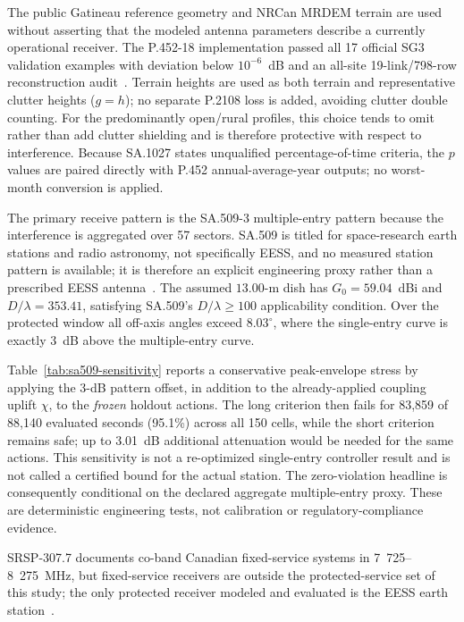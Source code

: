 \documentclass[journal]{IEEEtran}
\begin{document}
The public Gatineau reference geometry and NRCan MRDEM terrain are used without asserting that the modeled antenna parameters describe a currently operational receiver. The P.452-18 implementation passed all 17 official SG3 validation examples with deviation below $10^{-6}$~dB and an all-site 19-link/798-row reconstruction audit~\cite{iturp452,iturp452validation}. Terrain heights are used as both terrain and representative clutter heights ($g=h$); no separate P.2108 loss is added, avoiding clutter double counting. For the predominantly open/rural profiles, this choice tends to omit rather than add clutter shielding and is therefore protective with respect to interference. Because SA.1027 states unqualified percentage-of-time criteria, the $p$ values are paired directly with P.452 annual-average-year outputs; no worst-month conversion is applied.

The primary receive pattern is the SA.509-3 multiple-entry pattern because the interference is aggregated over 57 sectors. SA.509 is titled for space-research earth stations and radio astronomy, not specifically EESS, and no measured station pattern is available; it is therefore an explicit engineering proxy rather than a prescribed EESS antenna~\cite{itursa509}. The assumed $13.00$-m dish has $G_0=59.04$~dBi and $D/\lambda=353.41$, satisfying SA.509's $D/\lambda\ge100$ applicability condition. Over the protected window all off-axis angles exceed $8.03^\circ$, where the single-entry curve is exactly 3~dB above the multiple-entry curve.

Table~\ref{tab:sa509-sensitivity} reports a conservative peak-envelope stress by applying the 3-dB pattern offset, in addition to the already-applied coupling uplift $\chi$, to the \emph{frozen} holdout actions. The long criterion then fails for 83,859 of 88,140 evaluated seconds (95.1\%) across all 150 cells, while the short criterion remains safe; up to 3.01~dB additional attenuation would be needed for the same actions. This sensitivity is not a re-optimized single-entry controller result and is not called a certified bound for the actual station. The zero-violation headline is consequently conditional on the declared aggregate multiple-entry proxy. These are deterministic engineering tests, not calibration or regulatory-compliance evidence.

SRSP-307.7 documents co-band Canadian fixed-service systems in 7~725--8~275~MHz, but fixed-service receivers are outside the protected-service set of this study; the only protected receiver modeled and evaluated is the EESS earth station~\cite{ised3077}.
\end{document}
